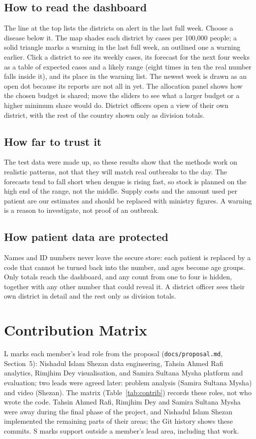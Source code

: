 \subsection*{How to read the dashboard}
The line at the top lists the districts on alert in the last full week. Choose a disease below it. The map
shades each district by cases per 100,000 people; a solid triangle marks a warning in the last full week, an
outlined one a warning earlier. Click a district to see its weekly cases, its forecast for the next four weeks as a table of
expected cases and a likely range (eight times in ten the real number falls inside it), and its place in the
warning list. The newest week is drawn as an open dot because its reports are not all in yet. The allocation panel shows how
the chosen budget is shared; move the sliders to see what a larger budget or a higher minimum share would do.
District officers open a view of their own district, with the rest of the country shown only as division
totals.

\subsection*{How far to trust it}
The test data were made up, so these results show that the methods work on realistic patterns, not that they
will match real outbreaks to the day. The forecasts tend to fall short when dengue is rising fast, so stock is
planned on the high end of the range, not the middle. Supply costs and the amount used per patient are our
estimates and should be replaced with ministry figures. A warning is a reason to investigate, not proof of an
outbreak.

\subsection*{How patient data are protected}
Names and ID numbers never leave the secure store: each patient is replaced by a code that cannot be turned
back into the number, and ages become age groups. Only totals reach the dashboard, and any count from one to
four is hidden, together with any other number that could reveal it. A district officer sees their own district
in detail and the rest only as division totals.

\section{Contribution Matrix}\label{app:contrib}
L marks each member's lead role from the proposal (\texttt{docs/proposal.md}, Section~5): Nishadul Islam Shezan
data engineering, Tahsin Ahmed Rafi analytics, Rimjhim Dey visualisation, and Samira Sultana Mysha platform and
evaluation; two leads were agreed later: problem analysis (Samira Sultana Mysha) and video (Shezan). The matrix (Table~\ref{tab:contrib}) records these roles, not who wrote the code. Tahsin Ahmed Rafi, Rimjhim Dey and Samira
Sultana Mysha were away during the final phase of the project, and Nishadul Islam Shezan implemented the remaining
parts of their areas; the Git history shows these commits. S marks support outside a member's lead area, including that work.

